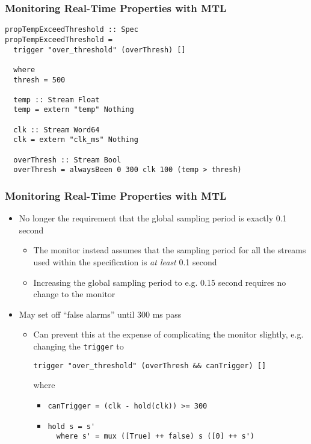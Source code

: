 \documentclass{beamer}
\begin{document}
\begin{frame}[fragile]
\frametitle{Monitoring Real-Time Properties with MTL}
\begin{lstlisting}
propTempExceedThreshold :: Spec
propTempExceedThreshold =
  trigger "over_threshold" (overThresh) []

  where
  thresh = 500

  temp :: Stream Float
  temp = extern "temp" Nothing

  clk :: Stream Word64
  clk = extern "clk_ms" Nothing

  overThresh :: Stream Bool
  overThresh = alwaysBeen 0 300 clk 100 (temp > thresh)
\end{lstlisting}
\end{frame}
\begin{frame}[fragile]
\frametitle{Monitoring Real-Time Properties with MTL}
\begin{itemize}
\item No longer the requirement that the global sampling period is exactly 0.1 second
  \begin{itemize}
  \item The monitor instead assumes that the sampling period for all the streams used
  within the specification is \emph{at least} 0.1 second
  \item Increasing the global sampling period to e.g. 0.15 second requires no change
  to the monitor
  \end{itemize}
\item May set off ``false alarms'' until 300 ms pass
  \begin{itemize}
  \item Can prevent this at the expense of complicating the monitor slightly, e.g.
  changing the \verb,trigger, to
\begin{lstlisting}
trigger "over_threshold" (overThresh && canTrigger) []
\end{lstlisting}
  where
    \begin{itemize}
    \item \verb,canTrigger = (clk - hold(clk)) >= 300,
    \item
\begin{lstlisting}
hold s = s'
  where s' = mux ([True] ++ false) s ([0] ++ s')
\end{lstlisting}
    \end{itemize}   
  \end{itemize}
\end{itemize}
\end{frame}
\end{document}

